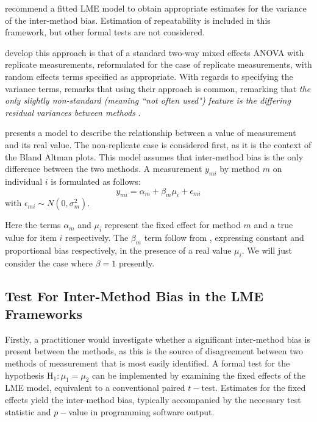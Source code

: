 \documentclass[12pt, a4paper]{report}
\theoremstyle{plain}
\theoremstyle{definition}
\theoremstyle{remark}
\begin{document}
	\citet{BXC2008} recommend a fitted LME model to obtain appropriate estimates for the variance of the inter-method bias.  Estimation of repeatability is included in this framework, but other formal tests are not considered.
	
	
	
	\citet{BXC2008} develop this approach is that of a standard two-way mixed effects ANOVA with replicate measurements, reformulated for the case of replicate measurements, with random effects terms specified as appropriate. With regards to specifying the variance terms, \citet{BXC2008} remarks that using their approach is common, remarking that \emph{the only slightly non-standard (meaning ``not often used") feature is the differing residual variances between methods }\citep{BXC2010}.
	
	
	

	
%	
	
	\citet{BXC2004} presents a model to describe the relationship between a value of measurement and its real value. The non-replicate case is considered first, as it is the context of the Bland Altman plots. This model assumes that inter-method bias is the only difference between the two methods. A measurement $y_{mi}$ by method $m$ on individual $i$ is formulated as follows:
	\begin{equation}
		y_{mi}  = \alpha_{m} + \beta_m\mu_{i} + \epsilon_{mi}
	\end{equation}
	with $\epsilon_{mi} \sim N(0,\sigma^{2}_{m})$.

	Here the terms $\alpha_{m}$ and $\mu_{i}$ represent the fixed effect for method $m$ and a true value for item $i$ respectively.  The $\beta_{m}$ term follow from \citet{DunnSEME}, expressing constant and proportional bias respectively, in the presence of a real value $\mu_{i}.$ We will just consider the case where $\beta=1$ presently. 
 	
	\subsection{Test For Inter-Method Bias in the LME Frameworks}
Firstly, a practitioner would investigate whether a significant inter-method bias is present between the methods, as this is the source of disagreement between two methods of measurement that is most easily identified. A formal test for the hypothesis $\operatorname{H_1} : \mu_1 = \mu_2$ can be implemented by examining the fixed effects of the LME model, equivalent to a conventional paired $t-$test. Estimates for the fixed effects yield the inter-method bias, typically accompanied by the necessary test statistic and $p-$value in programming software output.
\end{document}
